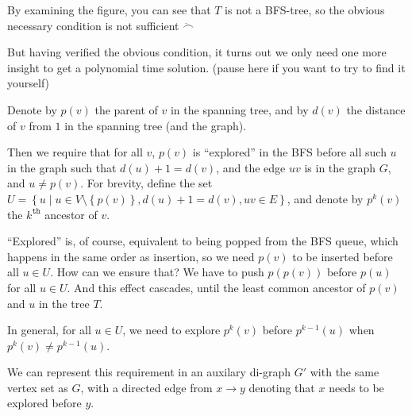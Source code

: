         By examining the figure, you can see that $T$ is not a BFS-tree, so the obvious necessary
        condition is not sufficient $\ddot\smallfrown$

        But having verified the obvious condition, it turns out we only need one more insight
        to get a polynomial time solution.
        (pause here if you want to try to find it yourself)

        Denote by $p(v)$ the parent of $v$ in the spanning tree,
        and by $d(v)$ the distance of $v$ from $1$ in the spanning tree
        (and the graph).

        Then we require that for all $v$, $p(v)$ is ``explored''
        in the BFS before all such $u$ in the graph such that
        $d(u) + 1 = d(v)$, and the edge $uv$ is in the graph $G$,
        and $u \neq p(v)$.
        For brevity, define the set
        $U = \left\{u \mid u \in V\setminus \left\{p(v)\right\}, d(u) + 1 = d(v), uv \in E\right\}$,
        and denote by $p^k(v)$ the $k^{\texttt{th}}$ ancestor of $v$.

        ``Explored'' is, of course, equivalent to being popped from the BFS
        queue, which happens in the same order as insertion, so we
        need $p(v)$ to be inserted before all $u \in U$.
        How can we ensure that? We have to push $p(p(v))$ before
        $p(u)$ for all $u \in U$. And this effect cascades, until the
        least common ancestor of $p(v)$ and $u$ in the tree $T$.

        In general, for all $u \in U$, we need to explore
        $p^k(v)$ before $p^{k - 1}(u)$ when
        $p^k(v) \neq p^{k - 1}(u)$.

        We can represent this requirement in an auxilary di-graph
        $G'$ with the same vertex set as $G$,
        with a directed edge from $x \to y$ denoting that
        $x$ needs to be explored before $y$.

